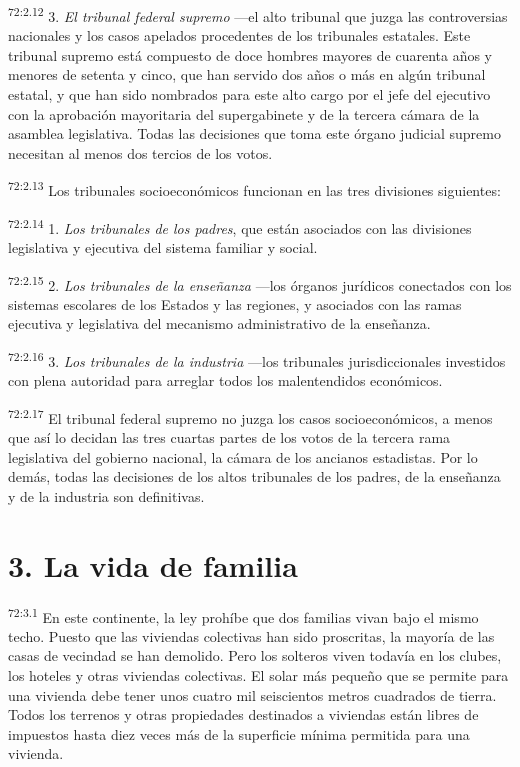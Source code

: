 \par
\textsuperscript{72:2.12} 3. \textit{El tribunal federal supremo} ---el alto tribunal que juzga las controversias nacionales y los casos apelados procedentes de los tribunales estatales. Este tribunal supremo está compuesto de doce hombres mayores de cuarenta años y menores de setenta y cinco, que han servido dos años o más en algún tribunal estatal, y que han sido nombrados para este alto cargo por el jefe del ejecutivo con la aprobación mayoritaria del supergabinete y de la tercera cámara de la asamblea legislativa. Todas las decisiones que toma este órgano judicial supremo necesitan al menos dos tercios de los votos.

\par
\textsuperscript{72:2.13} Los tribunales socioeconómicos funcionan en las tres divisiones siguientes:

\par
\textsuperscript{72:2.14} 1. \textit{Los tribunales de los padres}, que están asociados con las divisiones legislativa y ejecutiva del sistema familiar y social.

\par
\textsuperscript{72:2.15} 2. \textit{Los tribunales de la enseñanza} ---los órganos jurídicos conectados con los sistemas escolares de los Estados y las regiones, y asociados con las ramas ejecutiva y legislativa del mecanismo administrativo de la enseñanza.

\par
\textsuperscript{72:2.16} 3. \textit{Los tribunales de la industria} ---los tribunales jurisdiccionales investidos con plena autoridad para arreglar todos los malentendidos económicos.

\par
\textsuperscript{72:2.17} El tribunal federal supremo no juzga los casos socioeconómicos, a menos que así lo decidan las tres cuartas partes de los votos de la tercera rama legislativa del gobierno nacional, la cámara de los ancianos estadistas. Por lo demás, todas las decisiones de los altos tribunales de los padres, de la enseñanza y de la industria son definitivas.

\section*{3. La vida de familia}
\par
\textsuperscript{72:3.1} En este continente, la ley prohíbe que dos familias vivan bajo el mismo techo. Puesto que las viviendas colectivas han sido proscritas, la mayoría de las casas de vecindad se han demolido. Pero los solteros viven todavía en los clubes, los hoteles y otras viviendas colectivas. El solar más pequeño que se permite para una vivienda debe tener unos cuatro mil seiscientos metros cuadrados de tierra. Todos los terrenos y otras propiedades destinados a viviendas están libres de impuestos hasta diez veces más de la superficie mínima permitida para una vivienda.

